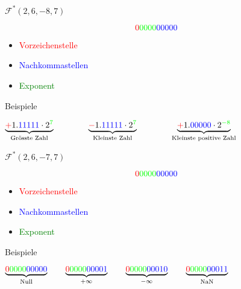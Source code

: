 \ifnum\conditionmacro=1 \documentclass[handout,usenames,dvipsnames]{beamer}\fi
\begin{document}
\begin{frame}{$\mathcal{F}^\ast(2,6,-8,7)$}
\begin{Huge}
\[{\color{red}{0}}{\color{green}{0000}}{\color{blue}{00000}}\]
\end{Huge}
\begin{itemize}
\item\textcolor{red}{Vorzeichenstelle}
\item\textcolor{blue}{Nachkommastellen}
\item\textcolor{green}{Exponent}
\end{itemize}
\begin{block}{Beispiele}

$\underbrace{\textcolor{red}{+}1.\textcolor{blue}{11111}\cdot 2^{\textcolor{green}{7}}}_\text{Grösste Zahl}\qquad\qquad \underbrace{\textcolor{red}{-}1.\textcolor{blue}{11111}\cdot2^{\textcolor{green}{7}}}_\text{Kleinste Zahl}\qquad\qquad\underbrace{\textcolor{red}{+}1.\textcolor{blue}{00000}\cdot2^{\textcolor{green}{-8}}}_\text{Kleinste positive Zahl}$

\end{block}
\end{frame}

\begin{frame}{$\mathcal{F}^\ast(2,6,-7,7)$}
\begin{Huge}
\[{\color{red}{0}}{\color{green}{0000}}{\color{blue}{00000}}\]
\end{Huge}
\begin{itemize}
\item\textcolor{red}{Vorzeichenstelle}
\item\textcolor{blue}{Nachkommastellen}
\item\textcolor{green}{Exponent}
\end{itemize}
\begin{block}{Beispiele}
\begin{center}
$\underbrace{\textcolor{red}{0}\textcolor{green}{0000}\textcolor{blue}{00000}}_\text{Null}\qquad \underbrace{\textcolor{red}{0}\textcolor{green}{0000}\textcolor{blue}{00001}}_{+\infty}\qquad\underbrace{\textcolor{red}{0}\textcolor{green}{0000}\textcolor{blue}{00010}}_{-\infty}\qquad\underbrace{\textcolor{red}{0}\textcolor{green}{0000}\textcolor{blue}{00011}}_\text{NaN}$
\end{center}
\end{block}
\end{frame}
\end{document}
